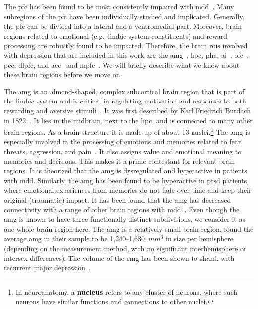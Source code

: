 The \gls{pfc} has been found to be most consistently impaired with \gls{mdd}~\parencite{George1994, Pizzagalli2021}.
Many subregions of the \gls{pfc} have been individually studied and implicated.
Generally, the \gls{pfc} can be divided into a lateral and a ventromedial part.
Moreover, brain regions related to emotional (e.g.~limbic system constituents) and reward processing are robustly found to be impacted.
Therefore, the brain \glspl{roi} involved with depression that are included in this work are the \gls{amg}~\parencite{Dannlowski2009, Kong2013, Connolly2017, Zhang2020}, \gls{hpc}, \gls{pha}, \gls{ai}~\parencite{Avery2014, Kandilarova2018}, \gls{ofc}~\parencite{Rolls2020}, \gls{pcc}, \gls{dlpfc}, and \gls{acc}~\parencite{Drevets2008} and \gls{mpfc}~\parencite{Pizzagalli2021}.
We will briefly describe what we know about these brain regions before we move on.

The \gls{amg} is an almond-shaped, complex subcortical brain region that is part of the limbic system and is critical in regulating motivation and responses to both rewarding and aversive stimuli~\parencite{Nestler2002}.
It was first described by Karl Friedrich Burdach in 1822~\parencite{Burdach1826}.
It lies in the midbrain, next to the \gls{hpc}, and is connected to many other brain regions.
As a brain structure it is made up of about 13 nuclei.\footnote{In neuroanatomy, a \textbf{nucleus} refers to any cluster of neurons, where such neurons have similar functions and connections to other nuclei.}
The \gls{amg} is especially involved in the processing of emotions and memories related to fear, threats, aggression, and pain~\parencite{Thompson2017b}.
It also assigns value and emotional meaning to memories and decisions.
This makes it a prime contestant for relevant brain regions.
It is theorized that the \gls{amg} is dysregulated and hyperactive in patients with \gls{mdd}.
Similarly, the \gls{amg} has been found to be hyperactive in \gls{ptsd} patients, where emotional experiences from memories do not fade over time and keep their original (traumatic) impact.
It has been found that the \gls{amg} has decreased connectivity with a range of other brain regions with \gls{mdd}~\parencite{Tang2013, Ramasubbu2014}.
Even though the \gls{amg} is known to have three functionally distinct subdivisions, we consider it as one whole brain region here.
The \gls{amg} is a relatively small brain region.
\textcite{Brabec2010} found the average \gls{amg} in their sample to be 1,240--1,630~$mm^3$ in size per hemisphere (depending on the measurement method, with no significant interhemisphere or intersex differences).
The volume of the \gls{amg} has been shown to shrink with recurrent major depression~\parencite{Sheline1998}.


